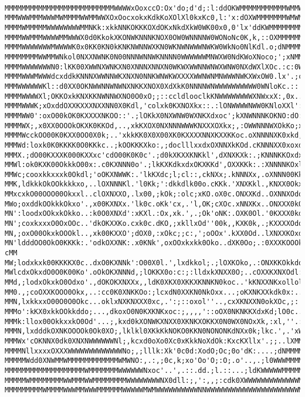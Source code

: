 \begin{verbatim}

MMMMMMMMMMMMMMMMMMMMMMMMMMWWWWxOoxccO:Ox'do;d'd;:l:ddOKWMMMMMMMMMMMWMMWMMMMMMMMM
MMMWWWMMMWWWMWMMMMWWMMWWXOxOocxokxKdkKoXOlXl0kxKc0,l:'x:dOXWMMMMMMMWMWMMMMMMMMMM
MMMMWMMMMMWWWWWWWWMMNKk:xkkNNKOKKKOXdOKxNkdXkW0WK00x0,0'lx'ddKWMMMMMMMMMWWMMMMMM
MMMMWWMMMWWWWMMWWWX0d0KkokXKONWKNNNKNOX0OW0WNNNNW0WONoNc0K,k,::OXMMMMMMMMMMMMMMM
MMMMWWWWWWWMWWWWK0x0KK0KN0kKNKNWNNWXKN0WKNWNWWWNWKW0WkNo0NlKdl.o;dNMMMMMMMMMMMMM
MMMMMMMMWWMMWNkol0NXXNWNK0N00NNNWNNWKNNNN0WWWWWWMNWXW0NdKWoXNoco;';xNMMMMMMMMMMM
MMMMWWWWWWWN0:lKK00XWWNXWNKXN0XNNNXNNXN0WKWXWWNNWNWXWNW0NXdWXlXOc.:c:0WMMMMMMMMM
MMMMWWWMWWWdcxddkKNNNXWWNNWKXNXN0NNKWNWKWXXXXWWNWNMNWWWNWKXWxOW0.lx'.;cXMMMMMMMM
MMMWWWWWWKl::d0XX0OKNWWNNWNWNXNKKXNOX0XdXkK0NNNNWNWWWWWWWWWW0WNloKc.::';KMMMMMMM
MMMMWWWWXl;OKKOxkKNXKKNWNNWXNO0O0xO;;::ccldlooclkKNWWWWWWWWXNWxxX:,0x..,;WMMMMMM
MMMMWWWK;xOxddOXXKXXXNXXNN0X0Kdl,'colxk0KXNOXkx::.:lONWWWWNWW0KNloXXl':,.lNMMMMM
MMMMWW0':oxO00kOK0KXXXXNKOO::'.;lOKkX0NXWNW0WXNKXdxoc';kXNWNNNKOKNO:dO:.,'oMMMMM
MMMMWX;,x0XX0OOOkOKXK0KKOd,..,xkKXOX0NXNNNWWWKNXXXOXkx;,:OWWNNNWXOkKo;xl..'xMMMM
MMMMWcckOO00K0KXX0OO0X0k;..'xkkKK0X0X00XK0KXXXXNNXKXXKKoc.oXNNNNXK0xkd,;;'.'NMMM
MMMWd:loxk0K0KKKK0O0KKkc..;kOOKKKXko:,;doclllxxdxOXNNXkKOd.cKNNNXX0xoxd:'''.lMMM
MMMX.;dO00KXXXK000KXXxc'cdO00K0K0c'.;d0kXKXXKNKkl',dXNXKXk:.;KNNNKKOxdxxo'..,MMM
MMWl:ok0KXK00OkkkO00x:.c0KXNNN0o'.;lkKXKdkxdxOKXKKd',OXXKKk:.:XNNNNKOxl:c:'',WMM
MMWc;cooxkkxxxk0Okdl;'oOKXNWWK:.'lkKXdc;l;cl::,ckNXx;.kNNNXx,.oXNNN00Kkl;'...;NM
MMK,ldkkkOkOOkkkkxo,..lOXNNNKl.'l0Kk;':dkkdlk00o.cKKk.'XNXKkl.,KNXX0OkxOOkd;..0M
MMxcxkO00OOO00Okxxl..clOXNXXO,.lx00,;kOk;:olc;xKO.oX0c.ONXXKd..OXNNXOdoc,',...0M
MWo;oxddkOOkkkOkxo'.,x00KXNXx.'lk0c.oKk'cx,.'l,OK;cXOc.xNNXKx..ONXXX0kOxo:;...0M
MN':loodxOOkxkOkko..:k0O0XNXd':xKXl.:Ox,xk.',.;Ok'oNK:.OXK0Ol.'0KXXX0kdddoc...KM
MN';coxkxxxO0OxOOc..'dkOKXXKo.cxk0c.dKO,;xkllxOd''00k,,KXK0k,.;KXXXXOdo:,,...'WM
MN,;oxO00OkxkOOOkl..,xk00KXXO';dOX0,:xOkc;;c:,';oOOx'.kXX0Od..lXNXXKOxdoc:;'.,MM
MN'ldddOO0OkO0KKKk:.'odkOXXNK:.x0KNk',oxOOxkxkk0Oko..dXK0Oo;.:0XXXKOOOkxo;.. cMM
MW;lodxkxk00KKKKX0c..dxO0KXNNk':O00X0l.',lxdkkol;.;lOXKOko,.:ONXKKOkkdo:,'...0MM
MWlcdxOkxdO0O0K00Ko'.oOkOKXNNNd,;lOKKX0o:c:;:lldxkXNXX0O;..cOXXKXNXOdl:'....oWMM
MMd,;lodxOkxkO0Odxo'.,dOKOKXNXXx,,ldK0XKX0XKKXKNNKN0koc..'kKNXXNKxollol:,'.lMMMM
MM0.,;coOXXKOOO0Okx,..:cc0K0XNKKOo:;lcxdN0XXKN0NkOxx...;oKXNKXXkdk0x:..'..cNMMMM
MMN,lxkkxxO00O0O0Okc...oklxNXKNXXX0xc,.':;::oxol''..,cxXKNXXN0okXOc,;:'..cNMMMMM
MMMo':kKX0xkkOOkkddo;...,dkoxO0N0KXKNKxoc:;,,,,'::oOX0NKNKKXdxKd;lO0c..,kMMMMMMM
MMMk:llox00OkkxxkO0Od'...;,kxd0kXONWKXNXX0XKNKXOKKX0N0WX0NOxXk,:xl,''.:XMMMMMMMM
MMMN,lxdddkOXNKOOOOk0Ok0XO;,lklkl0XKkKkNOKO0KKN0NONONKdNXx0k;lkc.',.'xWMMMMMMMMM
MMMWx'cOKNNX0dk0XNXNWWWWWWNl;,kcxd0oXo0Xc0xKkkNoXdOk:KxcKXllx'.;;..lXMMMMMMMMMMM
MMMMNllxxxxOXXXWWWWWWWWWWWWWNo;,;lllk:Xk'0c0d:XodO;Oc;0o'dK:....;dNMMMMMMMMMMMMM
MMMMMWdd0XNWMMWMMMMMMMMMMMMWMWNO:,.:,;0c,k;xo'Oo'O;:O;.o'..,.;l0WWWMMMMMMMMMMMMM
MMMMMMMMMMMMMMMMMMMWMMMMMMMWWWWWWNxoc'..',.::.dd.;l.::...;ldKWWWWWMMMMMMMMMMMMMM
MMMMMWMMMMMMMMWWMMMWWMMMMMMMMWWWWWWWWNX0dll:;,':,,;:cdk0XWWWWWWWWWWWWWMMMMMMMMMM
MMMMMMMMMWMMMMWWWMMWWWMMMMMMWWWWWMWMWWWWWWWWWWNNWWWWWWWWWWWWWWWWWWWWWWMMMMMMMMMM

\end{verbatim}
